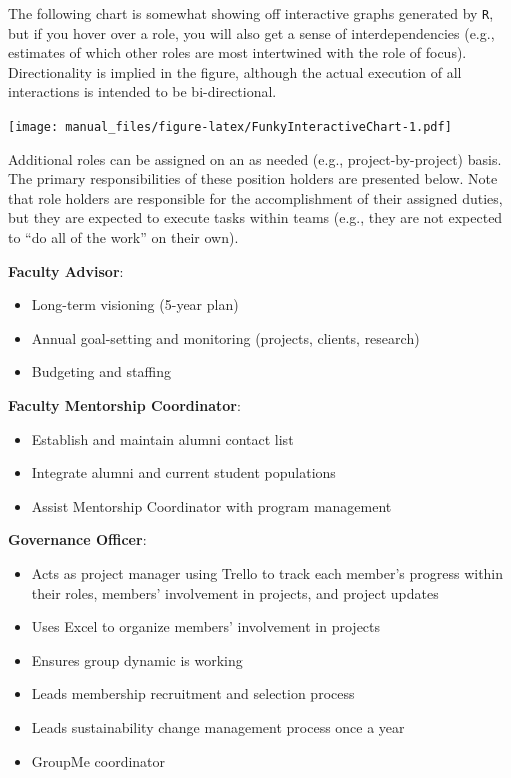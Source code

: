 \documentclass[
]{book}
\providecommand{\tightlist}{%
  \setlength{\itemsep}{0pt}\setlength{\parskip}{0pt}}
\begin{document}
The following chart is somewhat showing off interactive graphs generated by \texttt{R}, but if you hover over a role, you will also get a sense of interdependencies (e.g., estimates of which other roles are most intertwined with the role of focus). Directionality is implied in the figure, although the actual execution of all interactions is intended to be bi-directional.

\texttt{[image: manual\_files/figure-latex/FunkyInteractiveChart-1.pdf]}

Additional roles can be assigned on an as needed (e.g., project-by-project) basis. The primary responsibilities of these position holders are presented below. Note that role holders are responsible for the accomplishment of their assigned duties, but they are expected to execute tasks within teams (e.g., they are not expected to ``do all of the work'' on their own).

\textbf{Faculty Advisor}:

\begin{itemize}
\tightlist
\item
  Long-term visioning (5-year plan)
\item
  Annual goal-setting and monitoring (projects, clients, research)
\item
  Budgeting and staffing
\end{itemize}

\textbf{Faculty Mentorship Coordinator}:

\begin{itemize}
\tightlist
\item
  Establish and maintain alumni contact list\\
\item
  Integrate alumni and current student populations\\
\item
  Assist Mentorship Coordinator with program management
\end{itemize}

\textbf{Governance Officer}:

\begin{itemize}
\tightlist
\item
  Acts as project manager using Trello to track each member's progress within their roles, members' involvement in projects, and project updates
\item
  Uses Excel to organize members' involvement in projects
\item
  Ensures group dynamic is working
\item
  Leads membership recruitment and selection process\\
\item
  Leads sustainability change management process once a year
\item
  GroupMe coordinator
\end{itemize}
\end{document}
